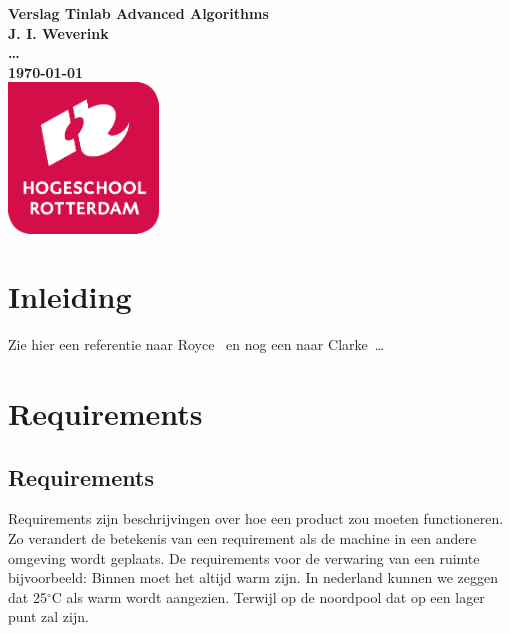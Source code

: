 \documentclass{article}%
\begin{document}
\sffamily
\begin{titlepage}
  \centering
    \vfill
    {\bfseries\Huge
      Verslag Tinlab Advanced Algorithms \\
        \vskip2cm
      }
      {\bfseries\Large
        J. I. Weverink\\
      }
      {
        \bfseries\normalsize
        \ldots\\
        \vskip1cm
        \today\\
    }    
    \vfill
    \includegraphics[width=4cm]{pictures/logohr.png} %
    \vfill
    \vfill
\end{titlepage}
\newpage
\tableofcontents

\newpage
\section{Inleiding}
Zie hier een referentie naar Royce~\cite{royce1987managing} en nog een naar Clarke~\cite{modelchecking}\ldots 




\clearpage %




\section{Requirements}

\subsection{Requirements}
Requirements zijn beschrijvingen over hoe een product zou moeten functioneren. Zo verandert de betekenis van een requirement als de machine in een andere omgeving wordt geplaats. De requirements voor de verwaring van een ruimte bijvoorbeeld: Binnen moet het altijd warm zijn. In nederland kunnen we zeggen dat 25$^{\circ}$C als warm wordt aangezien. Terwijl op de noordpool dat op een lager punt zal zijn.
\end{document}
